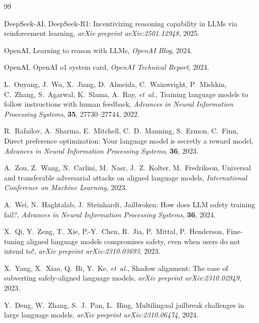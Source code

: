 \documentclass[AMS,STIX2COL]{WileyNJD-v2}
\begin{document}
\begin{thebibliography}{99}

DeepSeek-AI,
DeepSeek-R1: Incentivizing reasoning capability in LLMs via reinforcement
learning,
\textit{arXiv preprint arXiv:2501.12948}, 2025.

OpenAI,
Learning to reason with LLMs,
\textit{OpenAI Blog}, 2024.

OpenAI,
OpenAI o1 system card,
\textit{OpenAI Technical Report}, 2024.

L.~Ouyang, J.~Wu, X.~Jiang, D.~Almeida, C.~Wainwright, P.~Mishkin,
C.~Zhang, S.~Agarwal, K.~Slama, A.~Ray, \textit{et~al.},
Training language models to follow instructions with human feedback,
\textit{Advances in Neural Information Processing Systems},
\textbf{35}, 27730--27744, 2022.

R.~Rafailov, A.~Sharma, E.~Mitchell, C.~D.~Manning, S.~Ermon, C.~Finn,
Direct preference optimization: Your language model is secretly a reward
model,
\textit{Advances in Neural Information Processing Systems},
\textbf{36}, 2023.

A.~Zou, Z.~Wang, N.~Carlini, M.~Nasr, J.~Z.~Kolter, M.~Fredrikson,
Universal and transferable adversarial attacks on aligned language models,
\textit{International Conference on Machine Learning}, 2023.

A.~Wei, N.~Haghtalab, J.~Steinhardt,
Jailbroken: How does LLM safety training fail?,
\textit{Advances in Neural Information Processing Systems},
\textbf{36}, 2024.

X.~Qi, Y.~Zeng, T.~Xie, P.-Y.~Chen, R.~Jia, P.~Mittal, P.~Henderson,
Fine-tuning aligned language models compromises safety, even when users do
not intend to!,
\textit{arXiv preprint arXiv:2310.03693}, 2023.

X.~Yang, X.~Xiao, Q.~Bi, Y.~Ke, \textit{et~al.},
Shadow alignment: The ease of subverting safely-aligned language models,
\textit{arXiv preprint arXiv:2310.02949}, 2023.

Y.~Deng, W.~Zhang, S.~J.~Pan, L.~Bing,
Multilingual jailbreak challenges in large language models,
\textit{arXiv preprint arXiv:2310.06474}, 2024.


\end{thebibliography}
\end{document}
